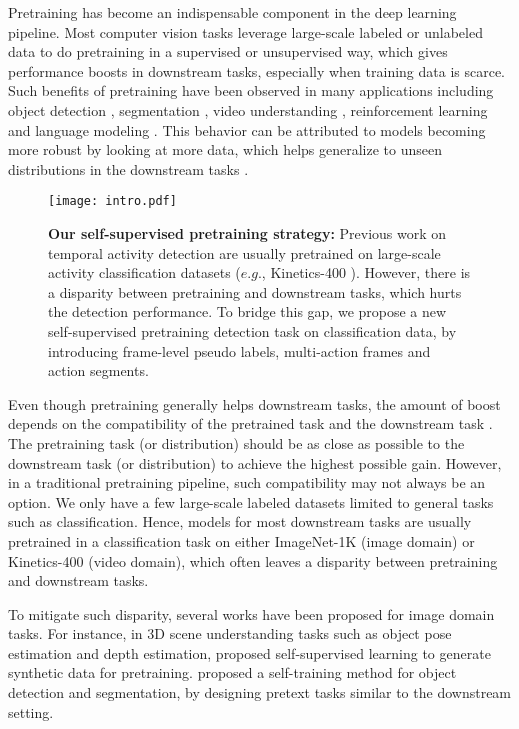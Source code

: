 \documentclass[10pt,twocolumn,letterpaper]{article}
\begin{document}
Pretraining has become an indispensable component in the deep learning pipeline. Most computer vision tasks leverage large-scale labeled or unlabeled data to do pretraining in a supervised or unsupervised way, which gives performance boosts in downstream tasks, especially when training data is scarce. Such benefits of pretraining have been observed in many applications including object detection \cite{mahajan2018exploring, dai2021up}, segmentation \cite{poudel2019fast}, video understanding \cite{ghadiyaram2019large}, reinforcement learning \cite{schwarzer2021pretraining} and language modeling \cite{liu2019roberta}. This behavior can be attributed to models becoming more robust by looking at more data, which helps generalize to unseen distributions in the downstream tasks \cite{bommasani2021opportunities}. 


\begin{figure}[t]
	\centering
	\texttt{[image: intro.pdf]}
	\caption{\textbf{Our self-supervised pretraining strategy:} Previous work on temporal activity detection are usually pretrained on large-scale activity classification datasets ($e.g.$, Kinetics-400 \cite{carreira2017quo}). However, there is a disparity between pretraining and downstream tasks, which hurts the detection performance. To bridge this gap, we propose a new self-supervised pretraining detection task on classification data, by introducing frame-level pseudo labels, multi-action frames and action segments. %
	}
	\vspace{-5mm}
	\label{fig:intro}
\end{figure}

Even though pretraining generally helps downstream tasks, the amount of boost depends on the compatibility of the pretrained task and the downstream task \cite{abnar2021exploring}. The pretraining task (or distribution) should be as close as possible to the downstream task (or distribution) to achieve the highest possible gain. However, in a traditional pretraining pipeline, such compatibility may not always be an option. We only have a few large-scale labeled datasets limited to general tasks such as classification. Hence, models for most downstream tasks are usually pretrained in a classification task on either ImageNet-1K \cite{deng2009imagenet} (image domain) or Kinetics-400 \cite{carreira2017quo} (video domain), which often leaves a disparity between pretraining and downstream tasks. 

To mitigate such disparity, several works have been proposed for image domain tasks. For instance, in 3D scene understanding tasks such as object pose estimation and depth estimation, \cite{Newell2020SSP} proposed self-supervised learning to generate synthetic data for pretraining. \cite{Zoph2020SSP} proposed a self-training method for object detection and segmentation, by designing pretext tasks similar to the downstream setting. 
\end{document}
